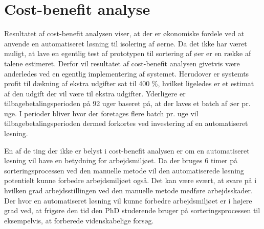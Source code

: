 \section{Cost-benefit analyse}
Resultatet af cost-benefit analysen viser, at der er økonomiske fordele ved at anvende en automatiseret løsning til isolering af øerne. Da det ikke har været muligt, at lave en egentlig test af prototypen til sortering af øer er en række af talene estimeret. Derfor vil resultatet af cost-benefit analysen givetvis være anderledes ved en egentlig implementering af systemet. Herudover er systemts profit til dækning af ekstra udgifter sat til 400 \%, hvilket ligeledes er et estimat af den udgift der vil være til ekstra udgifter. Yderligere er tilbagebetalingsperioden på 92 uger baseret på, at der laves et batch af øer pr. uge. I perioder bliver hvor der foretages flere batch pr. uge vil tilbagebetalingsperioden dermed forkortes ved investering af en automatiseret løsning.

En af de ting der ikke er belyst i cost-benefit analysen er om en automatiseret løsning vil have en betydning for arbejdsmiljøet. Da der bruges 6 timer på sorteringsprocessen ved den manuelle metode vil den automatiserede løsning potentielt kunne forbedre arbejdsmiljøet også. Det kan være svært, at svare på i hvilken grad arbejdsstillingen ved den manuelle metode medføre arbejdsskader. Der hvor en automatiseret løsning vil kunne forbedre arbejdsmiljøet er i højere grad ved, at frigøre den tid den PhD studerende bruger på sorteringsprocessen til eksempelvis, at forberede videnskabelige forsøg.
